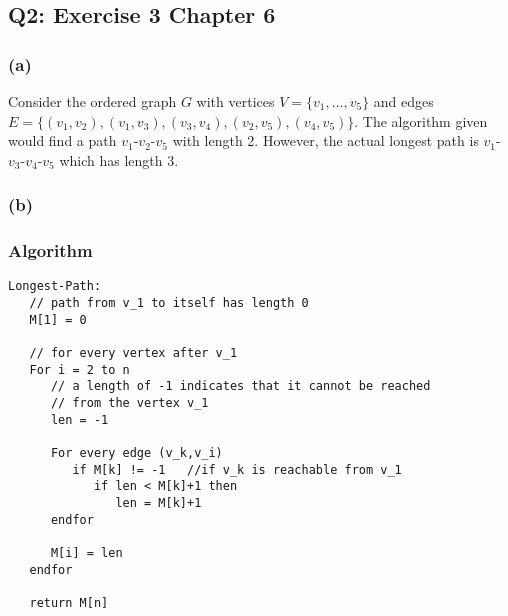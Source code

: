 \documentclass[12pt, oneside]{article}
\begin{document}
\subsection*{Q2: Exercise 3 Chapter 6}
\subsubsection*{(a)}
Consider the ordered graph $G$ with vertices $V=\{v_1,\dots,v_5\}$ and edges $E=\{(v_1,v_2),(v_1,v_3),(v_3,v_4),(v_2,v_5),(v_4,v_5)\}$. The algorithm given would find a path $v_1$-$v_2$-$v_5$ with length 2. However, the actual longest path is $v_1$-$v_3$-$v_4$-$v_5$ which has length 3.

\subsubsection*{(b)}
\subsubsection*{Algorithm}
\begin{verbatim}
Longest-Path:
   // path from v_1 to itself has length 0
   M[1] = 0
   
   // for every vertex after v_1
   For i = 2 to n
      // a length of -1 indicates that it cannot be reached
      // from the vertex v_1
      len = -1   
      
      For every edge (v_k,v_i)
         if M[k] != -1   //if v_k is reachable from v_1
            if len < M[k]+1 then
               len = M[k]+1
      endfor
      
      M[i] = len
   endfor
   
   return M[n]
\end{verbatim}
\end{document}
